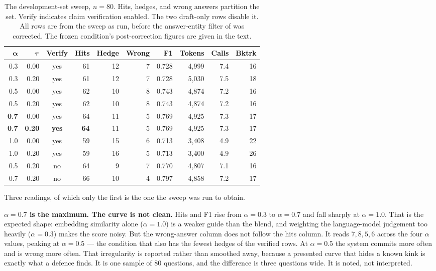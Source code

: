 \begin{table}[!tb]
  \begin{center}
    \caption[The development-set sweep]{The development-set sweep, $n = 80$.
    Hits, hedges, and wrong answers partition the set. \textsf{Verify} indicates
    claim verification enabled. The two draft-only rows disable it. All rows are
    from the sweep as run, before the answer-entity filter of
     was corrected. The frozen condition's
    post-correction figures are given in the text.}
    \label{tab:sweep}
    \small
    \begin{tabular}{|r|r|c|r|r|r|r|r|r|r|}
      \hline
      $\boldsymbol{\alpha}$ & $\boldsymbol{\tau}$ & \textbf{Verify} &
      \textbf{Hits} & \textbf{Hedge} & \textbf{Wrong} & \textbf{F1} &
      \textbf{Tokens} & \textbf{Calls} & \textbf{Bktrk} \\
      \hline
      0.3 & 0.00 & yes & 61 & 12 & 7 & 0.728 & 4{,}999 & 7.4 & 16 \\
      0.3 & 0.20 & yes & 61 & 12 & 7 & 0.728 & 5{,}030 & 7.5 & 18 \\
      0.5 & 0.00 & yes & 62 & 10 & 8 & 0.743 & 4{,}874 & 7.2 & 16 \\
      0.5 & 0.20 & yes & 62 & 10 & 8 & 0.743 & 4{,}874 & 7.2 & 16 \\
      \textbf{0.7} & 0.00 & yes & 64 & 11 & 5 & 0.769 & 4{,}925 & 7.3 & 17 \\
      \textbf{0.7} & \textbf{0.20} & \textbf{yes} & \textbf{64} & 11 & 5 &
        0.769 & 4{,}925 & 7.3 & 17 \\
      1.0 & 0.00 & yes & 59 & 15 & 6 & 0.713 & 3{,}408 & 4.9 & 22 \\
      1.0 & 0.20 & yes & 59 & 16 & 5 & 0.713 & 3{,}400 & 4.9 & 26 \\
      \hline
      0.5 & 0.20 & no  & 64 &  9 & 7 & 0.770 & 4{,}807 & 7.1 & 16 \\
      0.7 & 0.20 & no  & 66 & 10 & 4 & 0.797 & 4{,}858 & 7.2 & 17 \\
      \hline
    \end{tabular}
  \end{center}
\end{table}

Three readings, of which only the first is the one the sweep was run to obtain.

\textbf{$\alpha = 0.7$ is the maximum. The curve is not clean.} Hits and F1
rise from $\alpha = 0.3$ to $\alpha = 0.7$ and fall sharply at $\alpha = 1.0$.
That is the expected shape: embedding similarity alone ($\alpha = 1.0$) is a
weaker guide than the blend, and weighting the language-model judgement too
heavily ($\alpha = 0.3$) makes the score noisy. But the wrong-answer column does
not follow the hits column. It reads $7, 8, 5, 6$ across the four $\alpha$
values, peaking at $\alpha = 0.5$ --- the condition that also has the fewest
hedges of the verified rows. At $\alpha = 0.5$ the system commits more often and
is wrong more often. That irregularity is reported rather than smoothed
away, because a presented curve that hides a known kink is exactly what a
defence finds. It is one sample of $80$ questions, and the difference is three
questions wide. It is noted, not interpreted.

